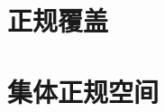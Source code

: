 \documentclass[main.tex]{subfiles}
\begin{document}
	
\section{正规覆盖}

	
\section{集体正规空间}

	
\end{document}

